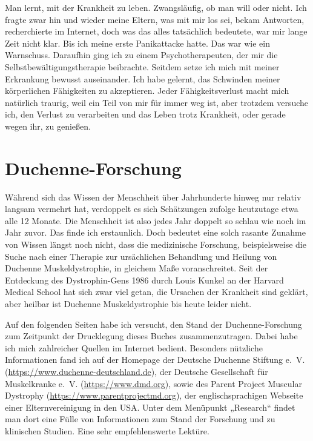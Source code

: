 \documentclass[fontsize=14pt,a4paper,headinclude,DIV=calc,automark]{scrbook}
\begin{document}
Man lernt, mit der Krankheit zu leben. Zwangsläufig, ob man will oder nicht. Ich fragte zwar hin und wieder meine Eltern, was mit mir los sei, bekam Antworten, recherchierte im Internet, doch was das alles tatsächlich bedeutete, war mir lange Zeit nicht klar. Bis ich meine erste Panikattacke hatte. Das war wie ein Warnschuss. Daraufhin ging ich zu einem Psychotherapeuten, der mir die Selbstbewältigungstherapie beibrachte. Seitdem setze ich mich mit meiner Erkrankung bewusst auseinander. Ich habe gelernt, das Schwinden meiner körperlichen Fähigkeiten zu akzeptieren. Jeder Fähigkeitsverlust macht mich natürlich traurig, weil ein Teil von mir für immer weg ist, aber trotzdem versuche ich, den Verlust zu verarbeiten und das Leben trotz Krankheit, oder gerade wegen ihr, zu genießen.

\section{Duchenne-Forschung}

Während sich das Wissen der Menschheit über Jahrhunderte hinweg nur relativ langsam vermehrt hat, verdoppelt es sich Schätzungen zufolge heutzutage etwa alle 12 Monate. Die Menschheit ist also jedes Jahr doppelt so schlau wie noch im Jahr zuvor. Das finde ich erstaunlich. Doch bedeutet eine solch rasante Zunahme von Wissen längst noch nicht, dass die medizinische Forschung, beispielsweise die Suche nach einer Therapie zur ursächlichen Behandlung und Heilung von Duchenne Muskeldystrophie, in gleichem Maße voranschreitet. Seit der Entdeckung des Dystrophin-Gens 1986 durch Louis Kunkel an der Harvard Medical School hat sich zwar viel getan, die Ursachen der Krankheit sind geklärt, aber heilbar ist Duchenne Muskeldystrophie bis heute leider nicht.

Auf den folgenden Seiten habe ich versucht, den Stand der Duchenne-Forschung zum Zeitpunkt der Drucklegung dieses Buches zusammenzutragen. Dabei habe ich mich zahlreicher Quellen im Internet bedient. Besonders nützliche Informationen fand ich auf der Homepage der Deutsche Duchenne Stiftung e.~V. (\url{https://www.duchenne-deutschland.de}), der Deutsche Gesellschaft für Muskelkranke e.~V. (\url{https://www.dmd.org}), sowie des Parent Project Muscular Dystrophy (\url{https://www.parentprojectmd.org}), der englischsprachigen Webseite einer Elternvereinigung in den USA. Unter dem Menüpunkt „Research“ findet man dort eine Fülle von Informationen zum Stand der Forschung und zu klinischen Studien. Eine sehr empfehlenswerte Lektüre.
\end{document}
